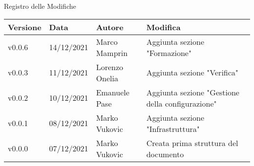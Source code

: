 \begin{center}
  \huge{Registro delle Modifiche}
\end{center}

\begin{center}
  \begin{tabular}{|p{2cm}|p{2cm}|p{3cm}|p{5cm}|}
    \hline
    \textbf{Versione} & \textbf{Data} & \textbf{Autore} & \textbf{Modifica}                    \\ \hline
    v0.0.6            & 14/12/2021    & Marco Mamprin   & Aggiunta sezione "Formazione" \\ \hline
    v0.0.3            & 11/12/2021    & Lorenzo Onelia  & Aggiunta sezione "Verifica" \\ \hline
    v0.0.2            & 10/12/2021    & Emanuele Pase   & Aggiunta sezione "Gestione della configurazione" \\ \hline
    v0.0.1            & 08/12/2021    & Marko Vukovic   & Aggiunta sezione "Infrastruttura" \\ \hline
    v0.0.0            & 07/12/2021    & Marko Vukovic   & Creata prima struttura del documento \\ \hline
  \end{tabular}
\end{center}
